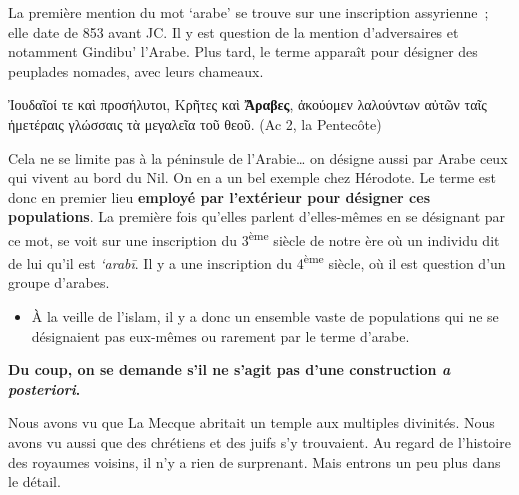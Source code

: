 La première mention du mot `arabe' se trouve sur une inscription
assyrienne~; elle date de 853 avant JC. Il y est question de la mention
d'adversaires et notamment Gindibu' l'Arabe. Plus tard, le terme
apparaît pour désigner des peuplades nomades, avec leurs chameaux.

Ἰουδαῖοί τε καὶ προσήλυτοι, Κρῆτες καὶ \textbf{Ἄραβες}, ἀκούομεν
λαλούντων αὐτῶν ταῖς ἡμετέραις γλώσσαις τὰ μεγαλεῖα τοῦ θεοῦ. (Ac 2, la
Pentecôte)

Cela ne se limite pas à la péninsule de l'Arabie\ldots{} on désigne
aussi par Arabe ceux qui vivent au bord du Nil. On en a un bel exemple
chez Hérodote. Le terme est donc en premier lieu \textbf{employé par
l'extérieur pour désigner ces populations}. La première fois qu'elles
parlent d'elles-mêmes en se désignant par ce mot, se voit sur une
inscription du 3\textsuperscript{ème} siècle de notre ère où un individu
dit de lui qu'il est \emph{`arabī}. Il y a une inscription du
4\textsuperscript{ème} siècle, où il est question d'un groupe d'arabes.

\begin{itemize}
\item
  À la veille de l'islam, il y a donc un ensemble vaste de populations
  qui ne se désignaient pas eux-mêmes ou rarement par le terme d'arabe.
\end{itemize}

\textbf{Du coup, on se demande s'il ne s'agit pas d'une construction
\emph{a posteriori}.}


Nous avons vu que La Mecque abritait un temple aux multiples divinités.
Nous avons vu aussi que des chrétiens et des juifs s'y trouvaient. Au
regard de l'histoire des royaumes voisins, il n'y a rien de surprenant.
Mais entrons un peu plus dans le détail.


